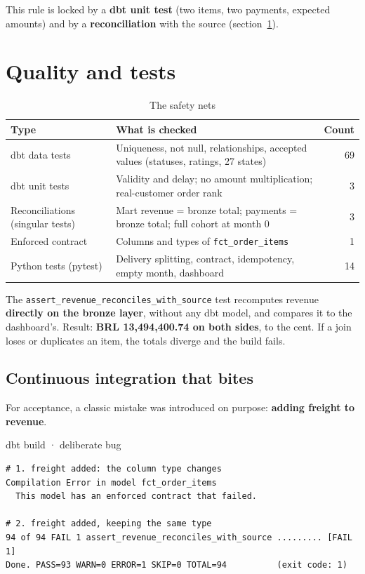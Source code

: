 \documentclass[11pt, a4paper, oneside, headings=normal, numbers=noenddot, DIV=12]{scrartcl}
\begin{document}
This rule is locked by a \textbf{dbt unit test} (two items, two payments, expected amounts) and by a \textbf{reconciliation} with the source
(section~\ref{sec:quality}).

\section{Quality and tests}\label{sec:quality}

\begin{table}[H]
\centering\small
\begin{tabularx}{\linewidth}{@{}L{4.4cm} Y r@{}}
\toprule
\textbf{Type} & \textbf{What is checked} & \textbf{Count} \\
\midrule
dbt data tests & Uniqueness, not null, relationships, accepted values (statuses, ratings, 27 states) & 69 \\
dbt unit tests & Validity and delay; no amount multiplication; real-customer order rank & 3 \\
Reconciliations (singular tests) & Mart revenue = bronze total; payments = bronze total; full cohort at month 0 & 3 \\
Enforced contract & Columns and types of \texttt{fct\_order\_items} & 1 \\
Python tests (pytest) & Delivery splitting, contract, idempotency, empty month, dashboard & 14 \\
\bottomrule
\end{tabularx}
\caption{The safety nets}
\end{table}

\begin{keybox}
The \texttt{assert\_revenue\_reconciles\_with\_source} test recomputes revenue \textbf{directly on the bronze layer}, without any dbt model,
and compares it to the dashboard's. Result: \textbf{BRL 13,494,400.74 on both sides}, to the cent. If a join loses or duplicates an
item, the totals diverge and the build fails.
\end{keybox}

\subsection{Continuous integration that bites}
For acceptance, a classic mistake was introduced on purpose: \textbf{adding freight to revenue}.

\begin{terminal}{dbt build · deliberate bug}
\begin{lstlisting}[style=terminal]
# 1. freight added: the column type changes
Compilation Error in model fct_order_items
  This model has an enforced contract that failed.

# 2. freight added, keeping the same type
94 of 94 FAIL 1 assert_revenue_reconciles_with_source ......... [FAIL 1]
Done. PASS=93 WARN=0 ERROR=1 SKIP=0 TOTAL=94          (exit code: 1)
\end{lstlisting}
\end{terminal}
\end{document}
